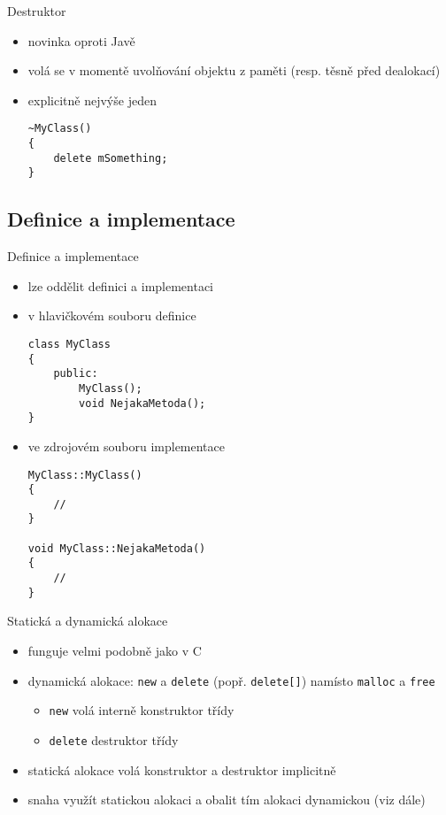 \documentclass{beamer}
\begin{document}
\begin{xframe}{Destruktor}
	\begin{itemize}
		\item novinka oproti Javě
		\item volá se v momentě uvolňování objektu z paměti (resp. těsně před dealokací)
		\item explicitně nejvýše jeden
\begin{lstlisting}[basicstyle=\ttfamily\small]
~MyClass()
{
    delete mSomething;
}
\end{lstlisting}
	\end{itemize}
\end{xframe}

\subsection{Definice a implementace}


\begin{xframe}{Definice a implementace}
	\begin{itemize}
		\item lze oddělit definici a implementaci
		\item v hlavičkovém souboru definice
\begin{lstlisting}[basicstyle=\fontsize{8}{9}\selectfont\ttfamily]
class MyClass
{
    public:
        MyClass();
        void NejakaMetoda();
}
\end{lstlisting}
		\item ve zdrojovém souboru implementace 
\begin{lstlisting}[basicstyle=\fontsize{8}{9}\selectfont\ttfamily]
MyClass::MyClass()
{
    //
}

void MyClass::NejakaMetoda()
{
    //
}
\end{lstlisting}
	\end{itemize}
\end{xframe}


\begin{xframe}{Statická a dynamická alokace}
	\begin{itemize}
		\item funguje velmi podobně jako v C
		\item dynamická alokace: \texttt{new} a \texttt{delete} (popř. \texttt{delete[]}) namísto \texttt{malloc} a \texttt{free}
			\begin{itemize}
				\item \texttt{new} volá interně konstruktor třídy
				\item \texttt{delete} destruktor třídy
			\end{itemize}
		\item statická alokace volá konstruktor a destruktor implicitně
		\item snaha využít statickou alokaci a obalit tím alokaci dynamickou (viz dále)
	\end{itemize}
\end{xframe}
\end{document}
